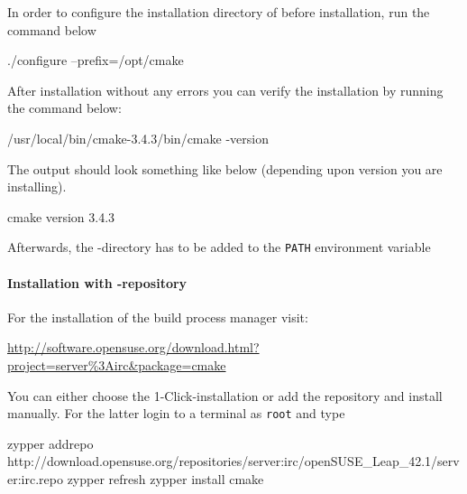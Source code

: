 In order to configure the installation directory of \marktool{\cmakename} before installation, run the command below

\begin{code}
./configure --prefix=/opt/cmake
\end{code}

After installation without any errors you can verify the installation by running the command below:

\begin{code}
/usr/local/bin/cmake-3.4.3/bin/cmake -version
\end{code}

The output should look something like below (depending upon \marktool{\cmakename} version you are installing).

\begin{code}
cmake version 3.4.3
\end{code}

Afterwards, the \marktool{\cmakename}-directory has to be added to the \verb+PATH+ environment variable

\begingroup
\lstset{breaklines = true}

\endgroup

\paragraph{Installation with \texorpdfstring{\protect\marktool{\opensusename}}{\opensusename{}}-repository}

For the installation of the build process manager \marktool{\zyppername} visit:

\href{http://software.opensuse.org/download.html?project=server\%3Airc\&package=cmake}{http://software.opensuse.org/download.html?project=server\%3Airc\&package=cmake}

You can either choose the 1-Click-installation or add the repository and install manually. For the latter login to a terminal as \verb+root+ and type

\begingroup
\lstset{breaklines=true}
\begin{code}
zypper addrepo http://download.opensuse.org/repositories/server:irc/openSUSE_Leap_42.1/server:irc.repo
zypper refresh
zypper install cmake
\end{code}
\endgroup 